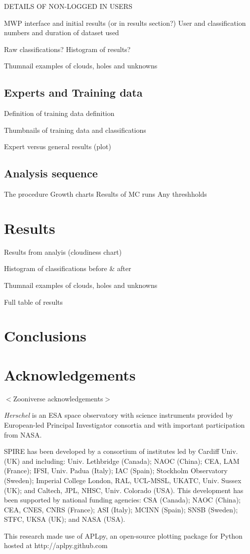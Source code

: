 \documentclass[a4,useAMS,usenatbib]{mn2e}
\newcommand*{\chck}[1]{{\color{red}$<$#1$>$}}
\begin{document}
DETAILS OF NON-LOGGED IN USERS


MWP interface and initial results (or in results section?)
User and classification numbers and duration of dataset used

Raw classifications?
Histogram of results?

Thumnail examples of clouds, holes and unknowns

\subsection{Experts and Training data}
Definition of training data definition

Thumbnails of training data and classifications

Expert versus general results (plot)

\subsection{Analysis sequence}
The procedure
Growth charts
Results of MC runs
Any threshholds


\section{Results}
Results from analyis (cloudiness chart)

Histogram of classifications before \& after

Thumnail examples of clouds, holes and unknowns

Full table of results

\section{Conclusions}


\section{Acknowledgements}
\chck{Zooniverse acknowledgements}

{\em Herschel} is an ESA space observatory with science instruments
provided by European-led Principal Investigator consortia and with important
participation from NASA.

SPIRE has been developed by a consortium of institutes led by Cardiff
Univ. (UK) and including: Univ. Lethbridge (Canada); NAOC (China);
CEA, LAM (France); IFSI, Univ. Padua (Italy); IAC (Spain); Stockholm
Observatory (Sweden); Imperial College London, RAL, UCL-MSSL, UKATC,
Univ. Sussex (UK); and Caltech, JPL, NHSC, Univ. Colorado (USA). This
development has been supported by national funding agencies: CSA
(Canada); NAOC (China); CEA, CNES, CNRS (France); ASI (Italy); MCINN
(Spain); SNSB (Sweden); STFC, UKSA (UK); and NASA (USA).

This research made use of APLpy, an open-source plotting package for
Python hosted at http://aplpy.github.com
\end{document}
